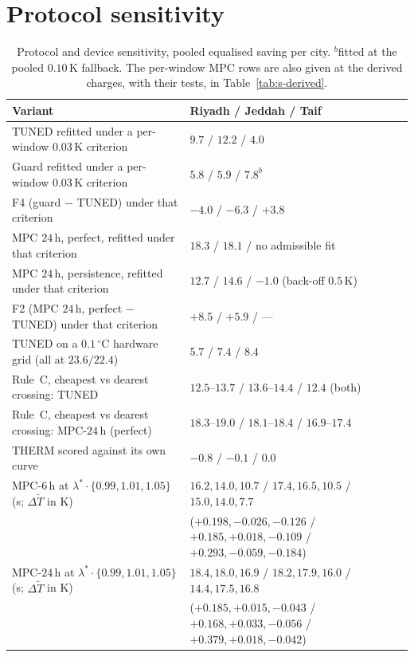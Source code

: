 \documentclass[11pt]{article}
\begin{document}
\section{Protocol sensitivity}
\label{sec:s-protocol}

\begin{table}[!ht]
\centering
\caption{Protocol and device sensitivity, pooled equalised saving per city.
$^{b}$fitted at the pooled $0.10\,$K fallback. The per-window MPC rows are also given at the derived charges, with their tests, in Table~\ref{tab:s-derived}.}
\label{tab:s-protocol}
\small
\begin{tabularx}{\textwidth}{@{}l>{\raggedright\arraybackslash}X@{}}
\toprule
Variant & Riyadh / Jeddah / Taif \\
\midrule
TUNED refitted under a per-window $0.03\,$K criterion & $9.7$ / $12.2$ / $4.0$ \\
Guard refitted under a per-window $0.03\,$K criterion & $5.8$ / $5.9$ / $7.8^{b}$ \\
F4 (guard $-$ TUNED) under that criterion & $-4.0$ / $-6.3$ / $+3.8$ \\
MPC $24\,$h, perfect, refitted under that criterion & $18.3$ / $18.1$ / no admissible fit \\
MPC $24\,$h, persistence, refitted under that criterion & $12.7$ / $14.6$ / $-1.0$ (back-off $0.5\,$K) \\
F2 (MPC $24\,$h, perfect $-$ TUNED) under that criterion & $+8.5$ / $+5.9$ / --- \\
TUNED on a $0.1\,^\circ$C hardware grid (all at $23.6/22.4$) & $5.7$ / $7.4$ / $8.4$ \\
Rule~C, cheapest vs dearest crossing: TUNED & $12.5$--$13.7$ / $13.6$--$14.4$ / $12.4$ (both) \\
Rule~C, cheapest vs dearest crossing: MPC-$24\,$h (perfect) & $18.3$--$19.0$ / $18.1$--$18.4$ / $16.9$--$17.4$ \\
THERM scored against its own curve & $-0.8$ / $-0.1$ / $0.0$ \\
MPC-$6\,$h at $\lambda^\ast\cdot\{0.99,1.01,1.05\}$ (s; $\Delta\tilde T$ in K) & $16.2,14.0,10.7$ / $17.4,16.5,10.5$ / $15.0,14.0,7.7$ \\
 & ($+0.198,-0.026,-0.126$ / $+0.185,+0.018,-0.109$ / $+0.293,-0.059,-0.184$) \\
MPC-$24\,$h at $\lambda^\ast\cdot\{0.99,1.01,1.05\}$ (s; $\Delta\tilde T$ in K) & $18.4,18.0,16.9$ / $18.2,17.9,16.0$ / $14.4,17.5,16.8$ \\
 & ($+0.185,+0.015,-0.043$ / $+0.168,+0.033,-0.056$ / $+0.379,+0.018,-0.042$) \\

\end{tabularx}
\end{table}
\end{document}

